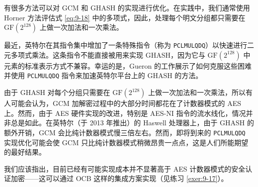 \begin{snote}[优化和性能。]
有很多方法可以对 GCM 和 GHASH 的实现进行优化。在实践中，我们通常使用 Horner 方法评估式 \ref{eq:9-18} 中的多项式，因此，处理每个明文分组都只需要在 $\mathrm{GF}(2^{128})$ 上做一次加法和一次乘法。

最近，英特尔在其指令集中增加了一条特殊指令（称为 \texttt{PCLMULQDQ}）以快速进行二元多项式乘法。这条指令不能直接被用来实现 GHASH，因为它与 $\mathrm{GF}(2^{128})$ 中元素的标准表示方式不兼容。幸运的是，Gueron 的工作展示了如何克服这些困难并使用 \texttt{PCLMULQDQ} 指令来加速英特尔平台上的 GHASH 的方法。

由于 GHASH 对每个分组只需要在 $\mathrm{GF}(2^{128})$ 上做一次加法和一次乘法，所以有人可能会认为，GCM 加解密过程中的大部分时间都花在了计数器模式的 AES 上。然而，由于 AES 硬件实现的改进，特别是 AES-NI 指令的流水线化，情况并非总是如此。在英特尔（于 2013 年推出）的 Haswell 处理器上，由于 GHASH 的额外开销，GCM 会比纯计数器模式慢三倍左右。然而，即将到来的 \texttt{PCLMULQDQ} 实现优化可能会使 GCM 只比纯计数器模式稍微昂贵一点点，这是人们所能期望的最好结果。

我们应该指出，目前已经有可能实现成本并不显著高于 AES 计数器模式的安全认证加密——这可以通过 OCB 这样的集成方案实现（见练习 \ref{exer:9-17}）。
\end{snote}